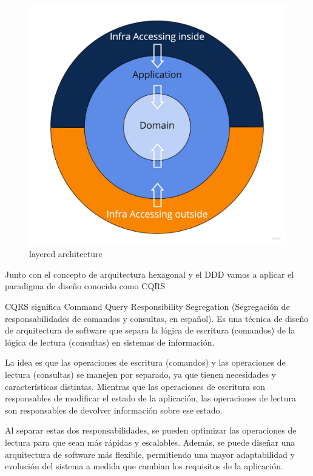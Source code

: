 \begin{figure}[H]
    \centering
    \includegraphics[height=0.3\textheight]{./part/Proyecto_ejecutivo/memoria_descriptiva/infoPreviaAntecedentes/img/PFM - Layer}
    \caption{layered architecture}\label{fig:layers}
\end{figure}

Junto con el concepto de arquitectura hexagonal y el DDD vamos a aplicar el paradigma de diseño conocido como CQRS

CQRS significa Command Query Responsibility Segregation (Segregación de responsabilidades de comandos y consultas, en español). Es una técnica de diseño de arquitectura de software que separa la lógica de escritura (comandos) de la lógica de lectura (consultas) en sistemas de información.

La idea es que las operaciones de escritura (comandos) y las operaciones de lectura (consultas) se manejen por separado, ya que tienen necesidades y características distintas. Mientras que las operaciones de escritura son responsables de modificar el estado de la aplicación, las operaciones de lectura son responsables de devolver información sobre ese estado.

Al separar estas dos responsabilidades, se pueden optimizar las operaciones de lectura para que sean más rápidas y escalables. Además, se puede diseñar una arquitectura de software más flexible, permitiendo una mayor adaptabilidad y evolución del sistema a medida que cambian los requisitos de la aplicación.

